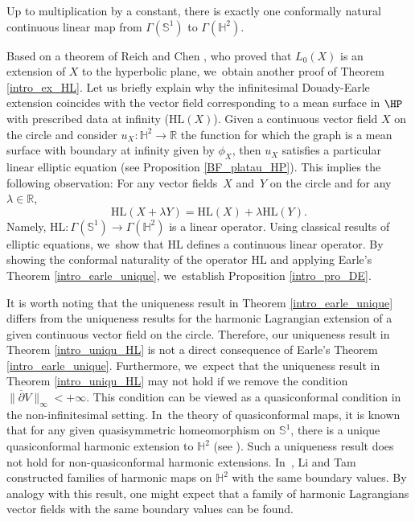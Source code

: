 \begin{theorem}\label{intro_earle_unique}
Up to multiplication by a constant, there is exactly one conformally natural continuous linear map from \(\Gamma(\mathbb{S}^1)\) to \(\Gamma(\mathbb{H}^2)\).
\end{theorem}

Based on a theorem of Reich and Chen \cite{Extension_with_bounded_derivative}, who proved that \(L_0(X) \) is an extension of \(X \) to the hyperbolic plane, we~obtain another proof of Theorem \ref{intro_ex_HL}. Let us briefly explain why the infinitesimal Douady-Earle extension coincides with the vector field corresponding to a mean surface in \(\HP\) with prescribed data at infinity (\ie $\mathrm{HL}(X)$). Given a continuous vector field \(X \) on the circle and consider \(u_X: \mathbb{H}^2 \to \mathbb{R} \) the function for which the graph is a mean surface with boundary at infinity given by \(\phi_X\), then \(u_X \) satisfies a particular linear elliptic equation (see Proposition \ref{BF_platau_HP}). This implies the following observation: For any vector fields~\(X \) and~\(Y \) on the circle and for any \(\lambda \in \mathbb{R}\),
\[
\mathrm{HL}(X + \lambda Y) = \mathrm{HL}(X) + \lambda \mathrm{HL}(Y).
\]
Namely, \(\mathrm{HL}: \Gamma(\mathbb{S}^1) \to \Gamma(\mathbb{H}^2)\) is
a linear operator. Using classical results of elliptic equations, we~show
that \(\mathrm{HL}\) defines a continuous linear operator. By showing the
conformal naturality of the operator \(\mathrm{HL}\) and applying Earle's
Theorem \ref{intro_earle_unique}, we~establish Proposition
\ref{intro_pro_DE}.

It is worth noting that the uniqueness result in Theorem \ref{intro_earle_unique} differs from the uniqueness results for the harmonic Lagrangian extension of a given continuous vector field on the circle. Therefore, our uniqueness result in Theorem \ref{intro_uniqu_HL} is not a direct consequence of Earle's Theorem \ref{intro_earle_unique}. Furthermore, we~expect that the uniqueness result in Theorem \ref{intro_uniqu_HL} may not hold if we remove the condition \(\lVert \overline{\partial} V \rVert_{\infty} < +\infty\). This condition can be viewed as a quasiconformal condition in the non-infinitesimal setting. In~the theory of quasiconformal maps, it is known that for any given quasisymmetric homeomorphism on \(\mathbb{S}^1\), there is a unique quasiconformal harmonic extension to \(\mathbb{H}^2\) (see \cite{LI_Tam1, Schoen_conjecture}). Such a uniqueness result does not hold for non-quasiconformal harmonic extensions. In~\cite{LI_Tam1, Li_Tam2}, Li and Tam constructed families of harmonic maps on \(\mathbb{H}^2\) with the same boundary values. By analogy with this result, one might expect that a family of harmonic Lagrangians vector fields with the same boundary values can be found.

